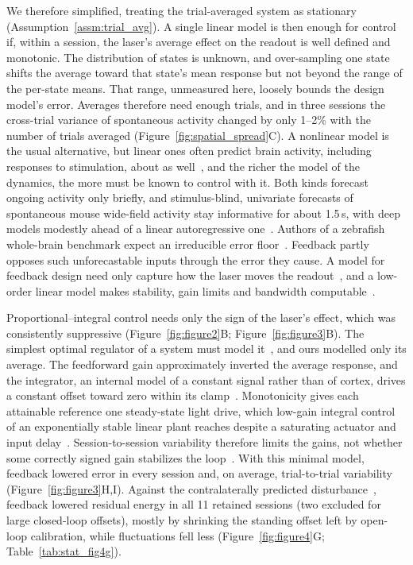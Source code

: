 We therefore simplified, treating the trial-averaged system as stationary (Assumption~\ref{assm:trial_avg}).
A single linear model is then enough for control if, within a session, the laser's average effect on the readout is well defined and monotonic.
The distribution of states is unknown, and over-sampling one state shifts the average toward that state's mean response but not beyond the range of the per-state means.
That range, unmeasured here, loosely bounds the design model's error.
Averages therefore need enough trials, and in three sessions the cross-trial variance of spontaneous activity changed by only 1--2\% with the number of trials averaged (Figure~\ref{fig:spatial_spread}C).
A nonlinear model is the usual alternative, but linear ones often predict brain activity, including responses to stimulation, about as well~\citep{Nozari2024,sani2024dissociative,Yang2021}, and the richer the model of the dynamics, the more must be known to control with it.
Both kinds forecast ongoing activity only briefly, and stimulus-blind, univariate forecasts of spontaneous mouse wide-field activity stay informative for about 1.5\,s, with deep models modestly ahead of a linear autoregressive one~\citep{lu2025benchmarking}.
Authors of a zebrafish whole-brain benchmark expect an irreducible error floor~\citep{lueckmann2025zapbench}.
Feedback partly opposes such unforecastable inputs through the error they cause.
A model for feedback design need only capture how the laser moves the readout~\citep{gevers2005identification}, and a low-order linear model makes stability, gain limits and bandwidth computable~\citep{astrom2008feedback}.

Proportional--integral control needs only the sign of the laser's effect, which was consistently suppressive (Figure~\ref{fig:figure2}B; Figure~\ref{fig:figure3}B).
The simplest optimal regulator of a system must model it~\citep{conant1970every}, and ours modelled only its average.
The feedforward gain approximately inverted the average response, and the integrator, an internal model of a constant signal rather than of cortex, drives a constant offset toward zero within its clamp~\citep{francis1976internal}.
Monotonicity gives each attainable reference one steady-state light drive, which low-gain integral control of an exponentially stable linear plant reaches despite a saturating actuator and input delay~\citep{logemann2000absolute}.
Session-to-session variability therefore limits the gains, not whether some correctly signed gain stabilizes the loop~\citep{morari1985robust}.
With this minimal model, feedback lowered error in every session and, on average, trial-to-trial variability (Figure~\ref{fig:figure3}H,I).
Against the contralaterally predicted disturbance~\citep{Shimaoka2019,Ye2026}, feedback lowered residual energy in all 11 retained sessions (two excluded for large closed-loop offsets), mostly by shrinking the standing offset left by open-loop calibration, while fluctuations fell less (Figure~\ref{fig:figure4}G; Table~\ref{tab:stat_fig4g}).

